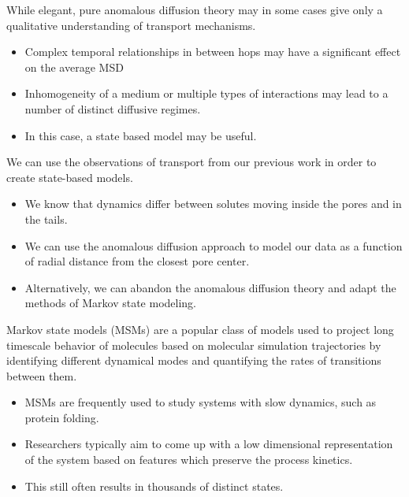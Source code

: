 \documentclass{article}
\begin{document}
  While elegant, pure anomalous diffusion theory may in some cases give only a qualitative
  understanding of transport mechanisms.
  \begin{itemize}
    \item Complex temporal relationships in between hops may have a significant effect on the average MSD
    \item Inhomogeneity of a medium or multiple types of interactions may lead to a number of
    distinct diffusive regimes. 
    \item In this case, a state based model may be useful. 
  \end{itemize}
  
  \noindent We can use the observations of transport from our previous work in order to create 
  state-based models.
  \begin{itemize}
  	\item We know that dynamics differ between solutes moving inside the pores and 
  	in the tails.
  	\item We can use the anomalous diffusion approach to model our data as a 
  	function of radial distance from the closest pore center.
  	\item Alternatively, we can abandon the anomalous diffusion theory and adapt the 
  	methods of Markov state modeling.
  \end{itemize}

  Markov state models (MSMs) are a popular class of models used to project long timescale
  behavior of molecules based on molecular simulation trajectories by identifying
  different dynamical modes and quantifying the rates of transitions between them.
  \begin{itemize}
    \item MSMs are frequently used to study systems with slow dynamics, such as protein 
    folding.~\cite{snow_how_2005,chodera_automatic_2007}
    \item Researchers typically aim to come up with a low dimensional 
    representation of the system based on features which preserve the process
    kinetics.
    \item This still often results in thousands of distinct states. 
  \end{itemize}

  
\end{document}
